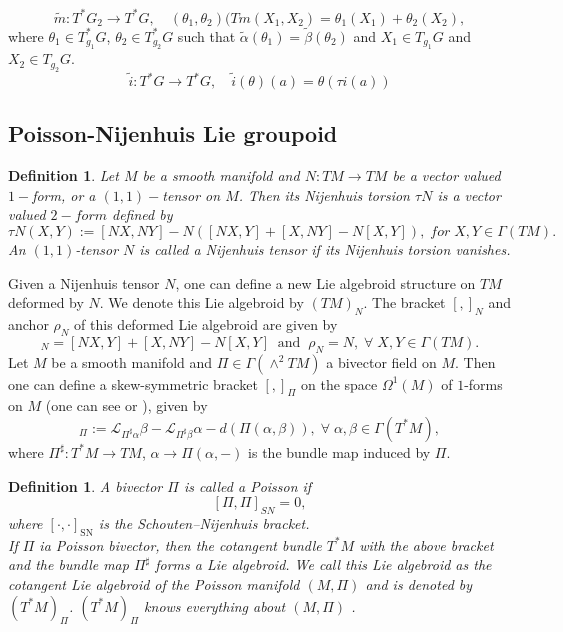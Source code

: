 \documentclass{article}
\newcommand{\SN}{\mathrm{SN}}
\newtheorem{definition}[theorem]{Definition}
\begin{document}
$$\tilde{m}: T^\ast G_2 \to T^\ast G, \quad (\theta_1, \theta_2)(Tm(X_1, X_2)=\theta_1(X_1)+\theta_2(X_2),$$
where $\theta_1\in T^\ast_{g_1}G$, $\theta_2\in T^\ast_{g_2}G$  such that  $\tilde{\alpha}(\theta_1)=\tilde{\beta}(\theta_2)$ and  $X_1\in T_{g_1}G$ and $X_2\in T_{g_2}G$.
$$\tilde{i}: T^\ast G\to T^\ast G, \quad \tilde{i}(\theta)(a)=\theta(\tau i(a))$$

\subsection{Poisson-Nijenhuis Lie groupoid}

\begin{definition}\label{NT}
Let $M$ be a smooth manifold and $N:TM \to TM$ be a vector valued $1-$form, or a $(1,1)-$tensor on $M$. Then its Nijenhuis torsion $\tau N$ is a vector valued $2-form$ defined by 
\begin{equation}
\tau N(X,Y):=[NX,NY ]-N([NX,Y]+[X,NY ]-N[X,Y ]), \; for\;  X,Y\in \Gamma(TM).
\end{equation}
An $(1,1)$-tensor $N$ is called a Nijenhuis tensor if its Nijenhuis torsion vanishes.
\end{definition}
Given a Nijenhuis tensor $N$, one can define a new Lie algebroid structure on $TM$ deformed by $N$. We denote this Lie algebroid by $(TM)_N$. The bracket $[ , ]_N$ and anchor $\rho_N$ of this deformed Lie algebroid are given by
\begin{equation}
[X,Y]_N=[NX,Y]+[X,NY ]-N[X,Y ]\; \; \text{and}\;\;  \rho_N=N, \;\forall \;X,Y\in \Gamma(TM).
\end{equation}
Let $M$ be a smooth manifold and $\Pi \in \Gamma (\wedge^2 TM)$ a bivector field on $M$. Then one can define a skew-symmetric bracket $[, ]_\Pi$ on the space $\Omega^1(M)$ of $1$-forms on $M$ (one can see \cite{Vai} or \cite{Kos}), given by
\begin{equation}
[\alpha,\beta]_\Pi :=\mathcal{L}_{\Pi^{\sharp}\alpha}\beta-\mathcal{L}_{\Pi^{\sharp}\beta}\alpha-d(\Pi(\alpha,\beta)), \; \forall\; \alpha,\beta \in \Gamma(T^{\ast}M),
\end{equation}
 where $\Pi^{\sharp}:T^\ast M \to TM$, $\alpha \to \Pi(\alpha , -)$ is the bundle map induced by $\Pi$. 
 \begin{definition}
  A bivector $\Pi$ is called a Poisson if 
 \begin{equation}\label{PBV}
 [\Pi,\Pi]_{SN}=0,
 \end{equation}
 where $[\cdot,\cdot]_{\SN}$ is the Schouten–Nijenhuis bracket.\\
 If $\Pi$ ia Poisson bivector, then the cotangent bundle $T^\ast M$ with the above bracket and the bundle map $\Pi^{\sharp}$ forms a Lie algebroid. We call this Lie algebroid as the cotangent Lie algebroid of the Poisson manifold $(M,\Pi)$ and is denoted by $(T^\ast M)_\Pi$. $(T^\ast M)_\Pi$ knows everything about $(M,\Pi)$ . 
\end{definition}
\end{document}
